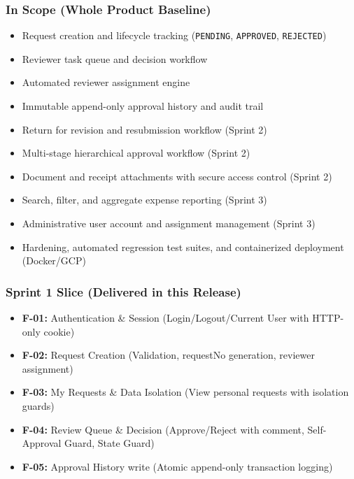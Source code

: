 \documentclass[11pt,a4paper]{article}
\begin{document}
\subsubsection{In Scope (Whole Product Baseline)}
\begin{itemize}[leftmargin=*,itemsep=2pt,topsep=2pt]
  \item Request creation and lifecycle tracking (\texttt{PENDING}, \texttt{APPROVED}, \texttt{REJECTED})
  \item Reviewer task queue and decision workflow
  \item Automated reviewer assignment engine
  \item Immutable append-only approval history and audit trail
  \item Return for revision and resubmission workflow (Sprint 2)
  \item Multi-stage hierarchical approval workflow (Sprint 2)
  \item Document and receipt attachments with secure access control (Sprint 2)
  \item Search, filter, and aggregate expense reporting (Sprint 3)
  \item Administrative user account and assignment management (Sprint 3)
  \item Hardening, automated regression test suites, and containerized deployment (Docker/GCP)
\end{itemize}
\subsubsection{Sprint 1 Slice (Delivered in this Release)}
\begin{itemize}[leftmargin=*,itemsep=2pt,topsep=2pt]
  \item \textbf{F-01:} Authentication \& Session (Login/Logout/Current User with HTTP-only cookie)
  \item \textbf{F-02:} Request Creation (Validation, requestNo generation, reviewer assignment)
  \item \textbf{F-03:} My Requests \& Data Isolation (View personal requests with isolation guards)
  \item \textbf{F-04:} Review Queue \& Decision (Approve/Reject with comment, Self-Approval Guard, State Guard)
  \item \textbf{F-05:} Approval History write (Atomic append-only transaction logging)
\end{itemize}
\end{document}
